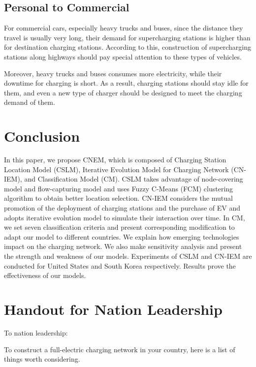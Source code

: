 \documentclass{mcmthesis}
\begin{document}
\subsection{Personal to Commercial}
For commercial cars, especially heavy trucks and buses, since the distance they travel is usually very long, their demand for supercharging stations is higher than for destination charging stations. According to this, construction of supercharging stations along highways should pay special attention to these types of vehicles.

Moreover, heavy trucks and buses consumes more electricity, while their downtime for charging is short. As a result, charging stations should stay idle for them, and even a new type of charger should be designed to meet the charging demand of them.
\section{Conclusion} \label{Sec-Conclusion}
In this paper, we propose CNEM, which is composed of Charging Station Location Model (CSLM), Iterative Evolution Model for Charging Network (CN-IEM), and Classification Model (CM). CSLM takes advantage of node-covering model and flow-capturing model and uses Fuzzy C-Means (FCM) clustering algorithm to obtain better location selection. CN-IEM considers the mutual promotion of the deployment of charging stations and the purchase of EV and adopts iterative evolution model to simulate their interaction over time. In CM, we set seven classification criteria and present corresponding modification to adapt our model to different countries. We explain how emerging technologies impact on the charging network. We also make sensitivity analysis and present the strength and weakness of our models. Experiments of CSLM and CN-IEM are conducted for United States and South Korea respectively. Results prove the effectiveness of our models.

\newpage
\section*{Handout for Nation Leadership}
\noindent To nation leadership:

\smallskip

To construct a full-electric charging network in your country, here is a list of things worth considering.
\end{document}
